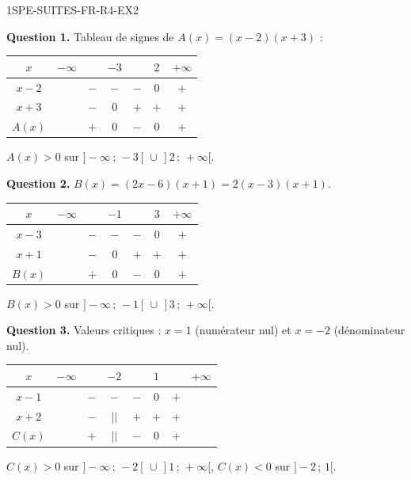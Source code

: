 \begin{corrige}{1SPE-SUITES-FR-R4-EX2}


\textbf{Question 1.} Tableau de signes de $A(x) = (x-2)(x+3)$ :

\begin{center}
\begin{tabular}{|c|cccccc|}
\hline
$x$ & $-\infty$ & & $-3$ & & $2$ & $+\infty$ \\
\hline
$x - 2$ & & $-$ & $-$ & $-$ & $0$ & $+$ \\
$x + 3$ & & $-$ & $0$ & $+$ & $+$ & $+$ \\
\hline
$A(x)$ & & $+$ & $0$ & $-$ & $0$ & $+$ \\
\hline
\end{tabular}
\end{center}

$A(x) > 0$ sur $]-\infty\,;\,-3[\,\cup\,]2\,;\,+\infty[$.


\textbf{Question 2.} $B(x) = (2x-6)(x+1) = 2(x-3)(x+1)$.

\begin{center}
\begin{tabular}{|c|cccccc|}
\hline
$x$ & $-\infty$ & & $-1$ & & $3$ & $+\infty$ \\
\hline
$x - 3$ & & $-$ & $-$ & $-$ & $0$ & $+$ \\
$x + 1$ & & $-$ & $0$ & $+$ & $+$ & $+$ \\
\hline
$B(x)$ & & $+$ & $0$ & $-$ & $0$ & $+$ \\
\hline
\end{tabular}
\end{center}

$B(x) > 0$ sur $]-\infty\,;\,-1[\,\cup\,]3\,;\,+\infty[$.

\textbf{Question 3.} Valeurs critiques : $x = 1$ (numérateur nul) et $x = -2$ (dénominateur nul).

\begin{center}
\begin{tabular}{|c|ccccccc|}
\hline
$x$ & $-\infty$ & & $-2$ & & $1$ & & $+\infty$ \\
\hline
$x - 1$ & & $-$ & $-$ & $-$ & $0$ & $+$ & \\
$x + 2$ & & $-$ & $||$ & $+$ & $+$ & $+$ & \\
\hline
$C(x)$ & & $+$ & $||$ & $-$ & $0$ & $+$ & \\
\hline
\end{tabular}
\end{center}

$C(x) > 0$ sur $]-\infty\,;\,-2[\,\cup\,]1\,;\,+\infty[$, $C(x) < 0$ sur $]-2\,;\,1[$.

\end{corrige}

